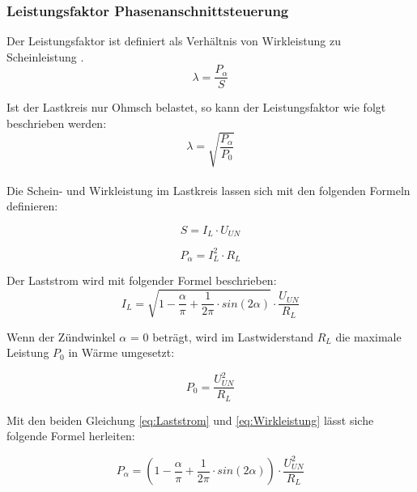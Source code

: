 \subsubsection{Leistungsfaktor Phasenanschnittsteuerung}\label{sec:Leistungsfaktor_Phasenanschnittsteuerung}
Der Leistungsfaktor ist definiert als Verhältnis von Wirkleistung zu Scheinleistung \cite{Leistungselektronik}. 
\begin{equation}\label{eq:lamda_p}
\lambda = \frac{P_{\alpha}}{S}
\end{equation}

Ist der Lastkreis nur Ohmsch belastet, so kann der Leistungsfaktor wie folgt beschrieben werden:
\begin{equation}\label{eq:lamda_ohmisch belastet}
\lambda =\sqrt{\frac{P_{\alpha}}{P_{0}}} 
\end{equation}
\\
Die Schein- und Wirkleistung im Lastkreis lassen sich mit den folgenden Formeln definieren:

\begin{equation}\label{eq:Scheinleistung}
S = I_L \cdot U_{UN}   
\end{equation}

\begin{equation}\label{eq:Wirkleistung}
 P_{\alpha} = I_L^2 \cdot R_L    
\end{equation}

Der Laststrom wird mit folgender Formel beschrieben:
\begin{equation}\label{eq:Laststrom}
I_L = \sqrt{1-\frac{\alpha}{\pi}+\frac{1}{2\pi} \cdot sin(2\alpha)} \cdot \frac{U_{UN}}{R_L}
\end{equation}

Wenn der Zündwinkel $\alpha$ = 0 beträgt, wird im Lastwiderstand $R_L$ die maximale Leistung $P_0$ in Wärme umgesetzt:

\begin{equation}\label{eq:Wirkleistung_bei_maximaler_alpha=0}
P_{0} = \frac{ U_{UN}^2}{R_L}  
\end{equation}

Mit den beiden Gleichung \ref{eq:Laststrom} und \ref{eq:Wirkleistung} lässt siche folgende Formel herleiten:

\begin{equation}\label{eq:p_alpha_neu}
P_{\alpha} = \left(1-\frac{\alpha}{\pi}+\frac{1}{2\pi} \cdot sin(2\alpha)\right)  \cdot \frac{U_{UN}^2}{R_L}
\end{equation}
 

